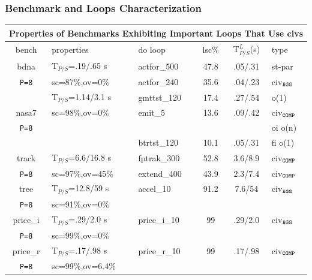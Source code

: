 \documentclass{beamer}
\begin{document}
\begin{frame}[fragile,t]
\frametitle{Benchmark and Loops Characterization}
\bigskip

\begin{scriptsize}
\begin{tabular}{|c|l|l|c|c|l|} \hline
\multicolumn{6}{|c|}{Properties of Benchmarks Exhibiting Important Loops That Use {\sc civ}s} \\ \hline
{\sc bench} & {\sc properties} & {\sc do loop}  & {\sc lsc}\%  & T$_{P/S}^L$(s) & {\sc type} \\ \hline
{\sc bdna}  &  T$_{P/S}$=.19/.65 s         & {\sc actfor\_500}  & 47.8 & .05/.31 & {\sc st-par}     \\ 
{\tt P=8}         &  {\sc sc}=87\%,{\sc ov}=0\%  & {\sc actfor\_240}  & 35.6 & .04/.23 & {\sc civ}$_{\tt{}AGG}$    \\ \hline 
             &  T$_{P/S}$=1.14/3.1 s         & {\sc gmttst\_120}  & 17.4 & .27/.54 & {\sc {\sc fi} {\sc o(1)}}   \\ 
{\sc nasa7}  &  {\sc sc}=98\%,{\sc ov}=0\%  & {\sc emit\_5}      & 13.6 & .09/.42 & {\sc civ}$_{\tt{}COMP}$   \\  %
{\tt P=8}        &                              &                      &                & & {\sc oi} {\sc o(n)}       \\
             &                              & {\sc btrtst\_120}  & 10.1 & .05/.31 & {\sc fi} {\sc o(1)}        \\ \hline
{\sc track}  &  T$_{P/S}$=6.6/16.8 s         & {\sc fptrak\_300}  & 52.8 & 3.6/8.9 & {\sc civ}$_{\tt{}COMP}$   \\ 
{\tt P=8}        &  {\sc sc}=97\%,{\sc ov}=45\%  & {\sc extend\_400}  & 43.9 & 2.3/7.4 & {\sc civ}$_{\tt{}COMP}$ \\ \hline 
{\sc tree}   &  T$_{P/S}$=12.8/59 s        & {\sc accel\_10}    & 91.2 & 7.6/54 & {\sc civ}$_{\tt{}AGG}$  \\            %
{\tt P=8}        &  {\sc sc}=91\%,{\sc ov}=0\% &                    &      &          &                           \\ \hline 
{\sc price\_i} &  T$_{P/S}$=.29/2.0 s        & {\sc price\_i\_10} & 99   & .29/2.0  & {\sc civ}$_{\tt{}AGG}$ \\ 
{\tt P=8}          &  {\sc sc}=99\%,{\sc ov}=0\% &                    &      &          &                           \\ \hline 
{\sc price\_r} &  T$_{P/S}$=.17/.98 s          & {\sc price\_r\_10}& 99   & .17/.98  & {\sc civ}$_{\tt{}COMP}$ \\ 

{\tt P=8}          &  {\sc sc}=99\%,{\sc ov}=6.4\% &                  &      &          &                          \\ \hline 
\end{tabular}
\end{scriptsize}

\end{frame}
\end{document}
